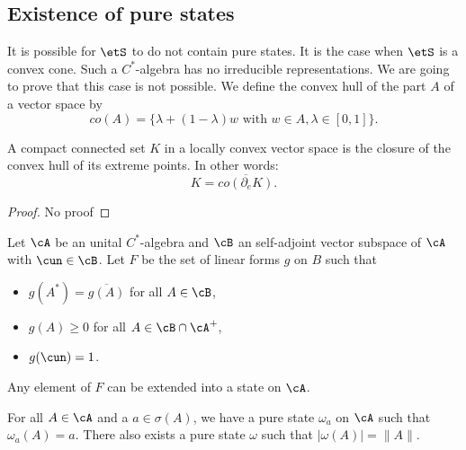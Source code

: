 \subsection{Existence of pure states}

It is possible for $\etS$ to do not contain pure states. It is the case when $\etS$ is a convex cone. Such a $C^*$-algebra  has no irreducible representations. We are going to prove that this case is not possible. We define the convex hull of the part $A$ of a vector space by
\[
	co(A)=\{ \lambda+(1-\lambda)w\text{ with }w\in A,\lambda\in[0,1] \}.
\]



\begin{theorem}
	A compact connected set $K$ in a locally convex vector space is the closure of the convex hull of its extreme points. In other words:
	\[
		K=\overline{ co(\partial_eK) }.
	\]

\end{theorem}
\begin{proof}
	No proof
\end{proof}


\begin{lemma}

	Let $\cA$ be an unital $C^*$-algebra  and $\cB$ an self-adjoint vector subspace of $\cA$ with $\cun\in\cB$. Let $F$ be the set of linear forms $g$ on $B$ such that


	\begin{itemize}
		\item  $g(A^*) = \overline{g(A)}$ for all $A\in\cB$,
		\item $g(A) \geq 0$ for all $A\in \cB\cap \cA^+$,
		\item $g(\cun)=1$.
	\end{itemize}
	Any element of $F$ can be extended into a state on $\cA$.
	\label{lem_DixcBprol}
\end{lemma}

\begin{theorem}
	For all $A\in\cA$ and a $a\in\sigma(A)$, we have a pure state $\omega_a$ on $\cA$ such that $\omega_a(A)=a$. There also exists a pure state $\omega$ such that $| \omega(A) |=\| A \|$.
	\label{tho_existsetat}
\end{theorem}

